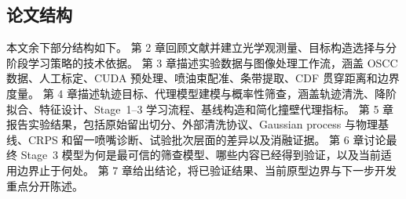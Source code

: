 \subsection{论文结构}

本文余下部分结构如下。
第 2 章回顾文献并建立光学观测量、目标构造选择与分阶段学习策略的技术依据。
第 3 章描述实验数据与图像处理工作流，涵盖 OSCC 数据、人工标定、CUDA 预处理、喷油束配准、条带提取、CDF 贯穿距离和边界度量。
第 4 章描述轨迹目标、代理模型建模与概率性筛查，涵盖轨迹清洗、降阶拟合、特征设计、Stage~1--3 学习流程、基线构造和简化撞壁代理指标。
第 5 章报告实验结果，包括原始留出切分、外部清洗协议、Gaussian process 与物理基线、CRPS 和留一喷嘴诊断、试验批次层面的差异以及消融证据。
第 6 章讨论最终 Stage~3 模型为何是最可信的筛查模型、哪些内容已经得到验证，以及当前适用边界止于何处。
第 7 章给出结论，将已验证结果、当前原型边界与下一步开发重点分开陈述。

